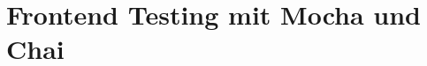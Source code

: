 \section{Frontend Testing mit Mocha und Chai}
\label{sec:t_frontend_testing_mit_mocha_und_chai'}




